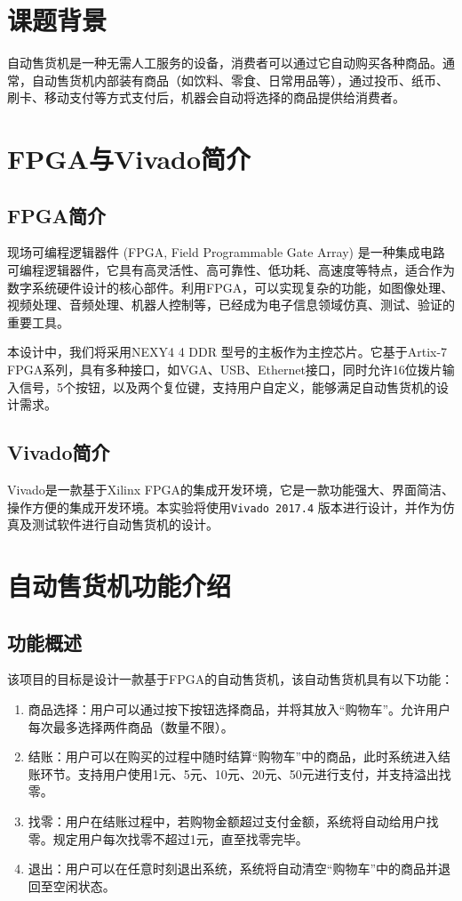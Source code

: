 \documentclass[12pt]{SEU-Circuit-Report}
\begin{document}
    \exptitlepage
    \section{课题背景}
    自动售货机是一种无需人工服务的设备，消费者可以通过它自动购买各种商品。通常，自动售货机内部装有商品（如饮料、零食、日常用品等），通过投币、纸币、刷卡、移动支付等方式支付后，机器会自动将选择的商品提供给消费者。
    \section{FPGA与Vivado简介}
    
    \subsection{FPGA简介}
    现场可编程逻辑器件 (FPGA, Field Programmable Gate Array) 是一种集成电路可编程逻辑器件，它具有高灵活性、高可靠性、低功耗、高速度等特点，适合作为数字系统硬件设计的核心部件。利用FPGA，可以实现复杂的功能，如图像处理、视频处理、音频处理、机器人控制等，已经成为电子信息领域仿真、测试、验证的重要工具。

    本设计中，我们将采用NEXY4 4 DDR 型号的主板作为主控芯片。它基于Artix-7 FPGA系列，具有多种接口，如VGA、USB、Ethernet接口，同时允许16位拨片输入信号，5个按钮，以及两个复位键，支持用户自定义，能够满足自动售货机的设计需求。
    \subsection{Vivado简介}
    Vivado是一款基于Xilinx FPGA的集成开发环境，它是一款功能强大、界面简洁、操作方便的集成开发环境。本实验将使用\texttt{Vivado 2017.4} 版本进行设计，并作为仿真及测试软件进行自动售货机的设计。
    \section{自动售货机功能介绍}
    \subsection{功能概述}
    该项目的目标是设计一款基于FPGA的自动售货机，该自动售货机具有以下功能：
    \begin{enumerate}
        \item 商品选择：用户可以通过按下按钮选择商品，并将其放入“购物车”。允许用户每次最多选择两件商品（数量不限）。
        \item 结账：用户可以在购买的过程中随时结算“购物车”中的商品，此时系统进入结账环节。支持用户使用1元、5元、10元、20元、50元进行支付，并支持溢出找零。
        \item 找零：用户在结账过程中，若购物金额超过支付金额，系统将自动给用户找零。规定用户每次找零不超过1元，直至找零完毕。
        \item 退出：用户可以在任意时刻退出系统，系统将自动清空“购物车”中的商品并退回至空闲状态。
    \end{enumerate}
\end{document}
